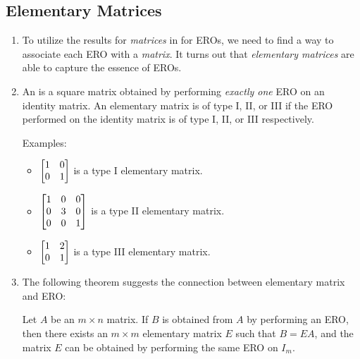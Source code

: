 \subsection{Elementary Matrices}
\begin{enumerate}
\item To utilize the results for \emph{matrices} in 
for EROs, we need to find a way to associate each ERO with a \emph{matrix}. It
turns out that \emph{elementary matrices} are able to capture the essence of
EROs.

\item An  is a square matrix obtained by performing
\emph{exactly one} ERO on an identity matrix. An elementary matrix is of type
I, II, or III if the ERO performed on the identity matrix is of type I, II, or
III respectively.

Examples:
\begin{itemize}
\item \(\mqty[1&0\\ 0&1]\) is a type I elementary matrix.
\item \(\mqty[1&0&0\\0&3&0\\ 0&0&1]\) is a type II elementary matrix.
\item \(\mqty[1&2\\ 0&1]\) is a type III elementary matrix.
\end{itemize}

\item The following theorem suggests the connection between elementary matrix
and ERO:
\begin{theorem}
\label{thm:elementary-matrix-ero-relate}
Let \(A\) be an \(m\times n\) matrix. If \(B\) is obtained from \(A\) by
performing an ERO, then there exists an \(m\times m\) elementary matrix \(E\)
such that \(B=EA\), and the matrix \(E\) can be obtained by performing the same
ERO on \(I_m\).


\end{theorem}
\end{enumerate}

